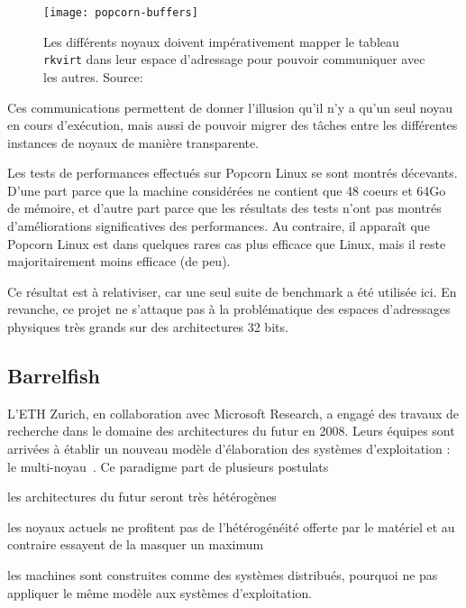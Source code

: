       \begin{figure}[h]
        \centering
        \texttt{[image: popcorn-buffers]}
        \caption{Les différents noyaux doivent impérativement mapper le tableau
          \texttt{rkvirt} dans leur espace d'adressage pour pouvoir communiquer
          avec les autres. Source:~\citeauthor{barbalacepopcorn}}
        \label{fig:popcorn-buf}
      \end{figure}

      Ces communications permettent de donner l’illusion qu’il n’y a qu’un seul
      noyau en cours d’exécution, mais aussi de pouvoir migrer des tâches entre
      les différentes instances de noyaux de manière transparente.

      Les tests de performances effectués sur Popcorn Linux se sont montrés
      décevants. D'une part parce que la machine considérées ne contient que
      48
      coeurs et 64Go de mémoire, et d'autre part parce que les résultats des
      tests n'ont pas montrés d'améliorations significatives des
      performances. Au contraire, il apparaît que Popcorn Linux est dans
      quelques rares cas plus efficace que Linux, mais il reste majoritairement
      moins efficace (de peu).

      Ce résultat est à relativiser, car une seul suite de benchmark a été
      utilisée ici. En revanche, ce projet ne s'attaque pas à la problématique
      des espaces d'adressages physiques très grands sur des architectures 32
      bits.


    \subsection{Barrelfish}
      
      L’ETH Zurich, en collaboration avec Microsoft Research, a engagé des
      travaux de recherche dans le domaine des architectures du futur en
      2008. Leurs équipes sont arrivées à établir un nouveau modèle
      d’élaboration des systèmes d’exploitation : le
      multi-noyau~\citep{schupbach2008embracing}. Ce paradigme part de plusieurs
      postulats\benumline \item les architectures du futur seront très
      hétérogènes \item les noyaux actuels ne profitent pas de l’hétérogénéité
      offerte par le matériel et au contraire essayent de la masquer un maximum
      \item les machines sont construites comme des systèmes distribués,
        pourquoi ne pas appliquer le même modèle aux systèmes
        d’exploitation\eenumline.

